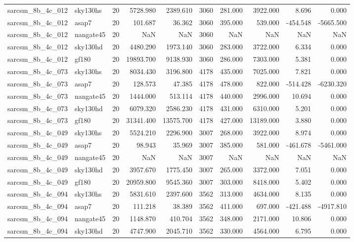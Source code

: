 \documentclass{article}
\begin{document}
\begin{longtable}{llrrrrrrrr}
sarcsm\_8b\_4c\_012 & sky130hs & 20 & 5728.980 & 2389.610 & 3060 & 281.000 & 3922.000 & 8.696 & 0.000 \\
sarcsm\_8b\_4c\_012 & asap7 & 20 & 101.687 & 36.362 & 3060 & 395.000 & 539.000 & -454.548 & -5665.500 \\
sarcsm\_8b\_4c\_012 & nangate45 & 20 & NaN & NaN & 3060 & NaN & NaN & NaN & NaN \\
sarcsm\_8b\_4c\_012 & sky130hd & 20 & 4480.290 & 1973.140 & 3060 & 283.000 & 3722.000 & 6.334 & 0.000 \\
sarcsm\_8b\_4c\_012 & gf180 & 20 & 19893.700 & 9138.930 & 3060 & 286.000 & 7303.000 & 5.381 & 0.000 \\
sarcsm\_8b\_4c\_073 & sky130hs & 20 & 8034.430 & 3196.800 & 4178 & 435.000 & 7025.000 & 7.821 & 0.000 \\
sarcsm\_8b\_4c\_073 & asap7 & 20 & 128.573 & 47.385 & 4178 & 478.000 & 822.000 & -514.428 & -6230.320 \\
sarcsm\_8b\_4c\_073 & nangate45 & 20 & 1444.000 & 513.114 & 4178 & 440.000 & 2996.000 & 10.694 & 0.000 \\
sarcsm\_8b\_4c\_073 & sky130hd & 20 & 6079.320 & 2586.230 & 4178 & 431.000 & 6310.000 & 5.201 & 0.000 \\
sarcsm\_8b\_4c\_073 & gf180 & 20 & 31341.400 & 13575.700 & 4178 & 427.000 & 13189.000 & 3.880 & 0.000 \\
sarcsm\_8b\_4c\_049 & sky130hs & 20 & 5524.210 & 2296.900 & 3007 & 268.000 & 3922.000 & 8.974 & 0.000 \\
sarcsm\_8b\_4c\_049 & asap7 & 20 & 98.943 & 35.969 & 3007 & 385.000 & 581.000 & -461.678 & -5461.000 \\
sarcsm\_8b\_4c\_049 & nangate45 & 20 & NaN & NaN & 3007 & NaN & NaN & NaN & NaN \\
sarcsm\_8b\_4c\_049 & sky130hd & 20 & 3957.670 & 1775.450 & 3007 & 265.000 & 3372.000 & 7.051 & 0.000 \\
sarcsm\_8b\_4c\_049 & gf180 & 20 & 20959.800 & 9545.360 & 3007 & 303.000 & 8418.000 & 5.402 & 0.000 \\
sarcsm\_8b\_4c\_094 & sky130hs & 20 & 5831.610 & 2397.600 & 3562 & 313.000 & 4634.000 & 8.135 & 0.000 \\
sarcsm\_8b\_4c\_094 & asap7 & 20 & 111.218 & 38.389 & 3562 & 411.000 & 697.000 & -421.488 & -4917.810 \\
sarcsm\_8b\_4c\_094 & nangate45 & 20 & 1148.870 & 410.704 & 3562 & 348.000 & 2171.000 & 10.806 & 0.000 \\
sarcsm\_8b\_4c\_094 & sky130hd & 20 & 4747.900 & 2045.710 & 3562 & 330.000 & 4564.000 & 6.795 & 0.000 \\

\end{longtable}
\end{document}
